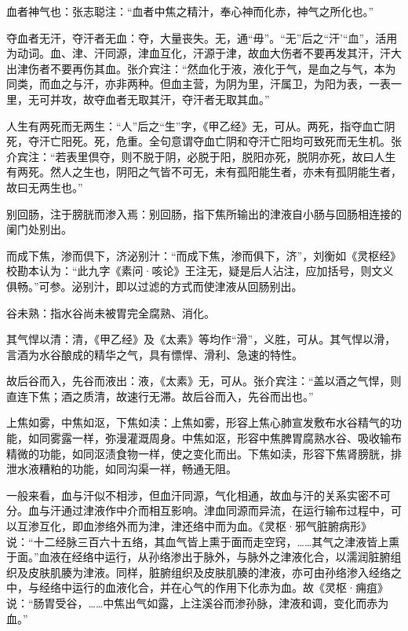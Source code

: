 \documentclass[12pt]{ctexbook}
\begin{document}
\begin{jiaozhu}
	\item 血者神气也：张志聪注：“血者中焦之精汁，奉心神而化赤，神气之所化也。”
	\item 夺血者无汗，夺汗者无血：夺，大量丧失。无，通“毋”。“无”后之“汗'“血”，活用为动词。血、津、汗同源，津血互化，汗源于津，故血大伤者不要再发其汗，汗大出津伤者不要再伤其血。张介宾注：“然血化于液，液化于气，是血之与气，本为同类，而血之与汗，亦非两种。但血主营，为阴为里，汗属卫，为阳为表，一表一里，无可并攻，故夺血者无取其汗，夺汗者无取其血。”
	\item 人生有两死而无两生：“人”后之“生”字，《甲乙经》无，可从。两死，指夺血亡阴死，夺汗亡阳死。死，危重。全句意谓夺血亡阴和夺汗亡阳均可致死而无生机。张介宾注：“若表里倶夺，则不脱于阴，必脱于阳，脱阳亦死，脱阴亦死，故曰人生有两死。然人之生也，阴阳之气皆不可无，未有孤阳能生者，亦未有孤阴能生者，故曰无两生也。”
	\item 别回肠，注于膀胱而渗入焉：别回肠，指下焦所输出的津液自小肠与回肠相连接的阑门处别出。
	\item 而成下焦，渗而倶下，济泌别汁：“而成下焦，渗而俱下，济”，刘衡如《灵枢经》校勘本认为：“此九字《素问·咳论》王注无，疑是后人沾注，应加括号，则文义俱畅。”可参。泌别汁，即以过滤的方式而使津液从回肠别出。
	\item 谷未熟：指水谷尚未被胃完全腐熟、消化。
	\item 其气悍以清：清，《甲乙经》及《太素》等均作“滑”，义胜，可从。其气悍以滑，言酒为水谷酿成的精华之气，具有慓悍、滑利、急速的特性。
	\item 故后谷而入，先谷而液出：液，《太素》无，可从。张介宾注：“盖以酒之气悍，则直连下焦；酒之质清，故速行无滞。故后谷而入，先谷而出也。”
	\item 上焦如雾，中焦如沤，下焦如渎：上焦如雾，形容上焦心肺宣发敷布水谷精气的功能，如同雾露一样，弥漫灌溉周身。中焦如沤，形容中焦脾胃腐熟水谷、吸收输布精微的功能，如同沤渍食物一样，使之变化而出。下焦如渎，形容下焦肾膀胱，排泄水液糟粕的功能，如同沟渠一祥，畅通无阻。
\end{jiaozhu}



一般来看，血与汗似不相涉，但血汗同源，气化相通，故血与汗的关系实密不可分。血与汗通过津液作中介而相互影响。津血同源而异流，在运行输布过程中，可以互渗互化，即血渗络外而为津，津还络中而为血。《灵枢·邪气脏腑病形》说：“十二经脉三百六十五络，其血气皆上熏于面而走空窍，……其气之津液皆上熏于面。”血液在经络中运行，从孙络渗出于脉外，与脉外之津液化合，以濡润脏腑组织及皮肤肌腠为津液。同样，脏腑组织及皮肤肌腠的津液，亦可由孙络渗入经络之中，与经络中运行的血液化合，并在心气的作用下化赤为血。故《灵枢·痈疽》说：“肠胃受谷，……中焦出气如露，上注溪谷而渗孙脉，津液和调，变化而赤为血。”
\end{document}
